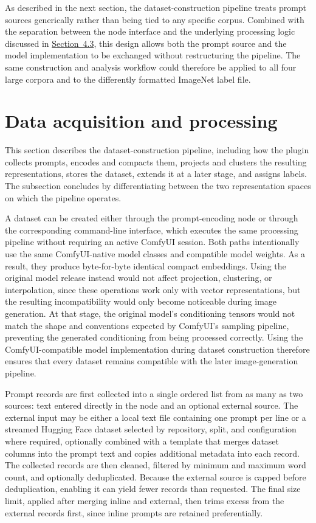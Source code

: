 As described in the next section, the dataset-construction pipeline treats prompt sources generically rather than being tied to any specific corpus. Combined with the separation between the node interface and the underlying processing logic discussed in \hyperref[sec:4.3]{Section~4.3}, this design allows both the prompt source and the model implementation to be exchanged without restructuring the pipeline. The same construction and analysis workflow could therefore be applied to all four large corpora and to the differently formatted ImageNet label file.

\section{Data acquisition and processing}\label{sec:4.6}

This section describes the dataset-construction pipeline, including how the plugin collects prompts, encodes and compacts them, projects and clusters the resulting representations, stores the dataset, extends it at a later stage, and assigns labels. The subsection concludes by differentiating between the two representation spaces on which the pipeline operates.

A dataset can be created either through the prompt-encoding node or through the corresponding command-line interface, which executes the same processing pipeline without requiring an active ComfyUI session. Both paths intentionally use the same ComfyUI-native model classes and compatible model weights. As a result, they produce byte-for-byte identical compact embeddings.
Using the original model release instead would not affect projection, clustering, or interpolation, since these operations work only with vector representations, but the resulting incompatibility would only become noticeable during image generation. At that stage, the original model's conditioning tensors would not match the shape and conventions expected by ComfyUI's sampling pipeline, preventing the generated conditioning from being processed correctly. Using the ComfyUI-compatible model implementation during dataset construction therefore ensures that every dataset remains compatible with the later image-generation pipeline.

Prompt records are first collected into a single ordered list from as many as two sources: text entered directly in the node and an optional external source. The external input may be either a local text file containing one prompt per line or a streamed Hugging Face dataset selected by repository, split, and configuration where required, optionally combined with a template that merges dataset columns into the prompt text and copies additional metadata into each record.
The collected records are then cleaned, filtered by minimum and maximum word count, and optionally deduplicated. Because the external source is capped before deduplication, enabling it can yield fewer records than requested. The final size limit, applied after merging inline and external, then trims excess from the external records first, since inline prompts are retained preferentially.


